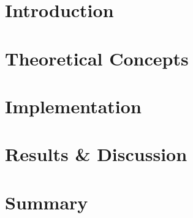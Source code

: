 \documentclass[pdftex,12pt,a4paper]{report}
\begin{document}

%

\tableofcontents



%
\newpage

\chapter{Introduction}
 

\chapter{Theoretical Concepts}


\chapter{Implementation}


\chapter{Results \& Discussion}


\chapter{Summary}

\end{document}
